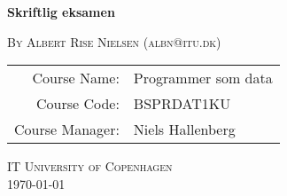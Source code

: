 \begin{titlepage}
  \vspace*{\fill}

  \begin{center}
    \hbox{\makebox[1\textwidth][c]{\bigguslinus}}
    {\Huge\textbf{Skriftlig eksamen} \par}
    \hbox{\makebox[1\textwidth][c]{\bigguslinus}}
    \vspace{1cm}

    \textsc{By Albert Rise Nielsen (albn@itu.dk)}\\[0.5cm]
    \begin{tabular}{rl}
        \midrule
          Course Name:& Programmer som data\\
          Course Code:& BSPRDAT1KU\\
          Course Manager:& Niels Hallenberg\\
        \bottomrule
    \end{tabular}
    
    \vspace{0.5cm}
    \textsc{IT University of Copenhagen}\\[0.5cm]
    \textsc{\today}
  \end{center}

  \vspace*{\fill}
\end{titlepage}